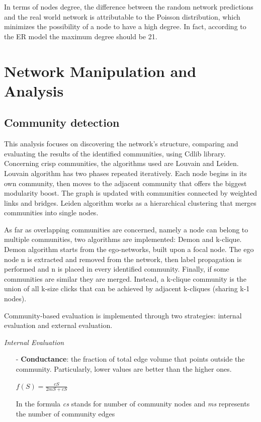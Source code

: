 \documentclass[sigchi]{acmart}
\begin{document}
In terms of nodes degree, the difference between the random network predictions and the real world network is attributable to the Poisson distribution, which minimizes the possibility of a node to have a high degree. In fact, according to the ER model the maximum degree should be 21.

\section{Network Manipulation and Analysis}

\subsection{Community detection}
This analysis focuses on discovering the network's structure, comparing and evaluating the results of the identified communities, using Cdlib \cite{Cdlib} library. 
Concerning crisp communities, the algorithms used are Louvain and Leiden.
Louvain algorithm has two phases repeated iteratively. Each node begins in its own community, then moves to the adjacent community that offers the biggest modularity boost. The graph is updated with communities connected by weighted links and bridges.
Leiden algorithm works as a hierarchical clustering that merges communities into single nodes. 

As far as overlapping communities are concerned, namely a node can belong to multiple communities, two algorithms are implemented: Demon and k-clique. Demon algorithm starts from the ego-networks, built upon a focal node. 
The ego node n is extracted and removed from the network, then label propagation is performed and n is placed in every identified community. Finally, if some communities are similar they are merged. 
Instead, a k-clique community is the union of all k-size clicks that can be achieved by adjacent k-cliques (sharing k-1 nodes).

Community-based evaluation is implemented through two strategies: internal evaluation and external evaluation.\vspace{8pt}

\vspace{5pt}
{\fontsize{10}{10}\selectfont \textit{Internal Evaluation }}

\begin{itemize}
  \item [-]\textbf{Conductance}: the fraction of total edge volume that points outside the community. Particularly, lower values are better than the higher ones.  \newline
\begin{center}
$f(S) = \displaystyle\frac{cS}{2mS + cS}$
\end{center}
 
\vspace{5pt}
\begin{flushleft}
In the formula \textit{cs} stands for number of community nodes and \textit{ms} represents the number of community edges
 \end{flushleft}
\vspace{10pt}
\end{itemize}
\end{document}
